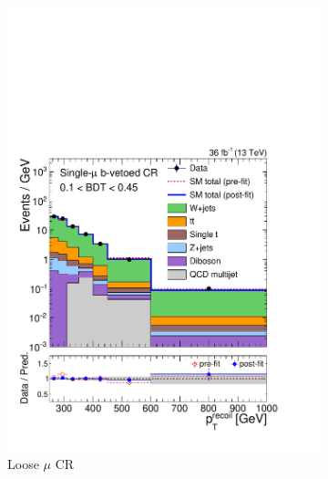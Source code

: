\begin{figure}[]
    \begin{center}
        \begin{subfigure}[t]{0.24\textwidth}
            \includegraphics[width=\textwidth]{figures/monotop/postfit/stackedPostfit_singlemuonw_monotop_loose.pdf}
            \caption{Loose $\mu$ CR}
        \end{subfigure}
        \begin{subfigure}[t]{0.24\textwidth}

\end{subfigure}
\end{center}
\end{figure}
